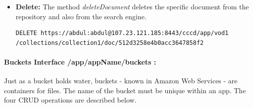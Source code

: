 \begin{itemize}
\item \textbf{Delete:} The method \textit{deleteDocument} deletes the specific document from the repository and also from the search engine.

\begin{code}
\begin{verbatim}
DELETE https://abdul:abdul@107.23.121.185:8443/cccd/app/vod1
/collections/collection1/doc/512d3258e4b0acc3647858f2
\end{verbatim}
\end{code}
 
\end{itemize}
\paragraph{Buckets Interface /app/{appName}/buckets :} Just as a bucket holds water, buckets - known in Amazon Web Services - are containers for files. The name of the bucket must be unique within an app. The four \ac{CRUD} operations are described below.

